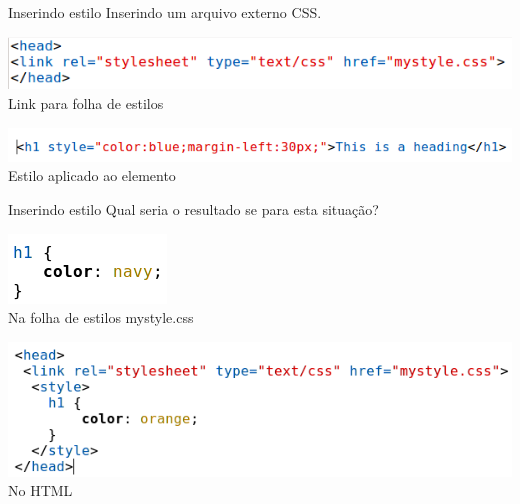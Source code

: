 \documentclass{beamer}
\begin{document}
\begin{frame}{Inserindo estilo}
Inserindo um arquivo externo CSS.
  \begin{center}
    \includegraphics[height=0.12\paperheight]{fig/aula3/external_css.png} \\
    \tiny Link para folha de estilos
  \end{center}
  \begin{center}
    \includegraphics[height=0.08\paperheight]{fig/aula3/estilo_elemento.png} \\
    \tiny Estilo aplicado ao elemento
  \end{center} 
\end{frame}
\begin{frame}{Inserindo estilo}
Qual seria o resultado se para esta situação?
  \begin{center}
    \includegraphics[height=0.2\paperheight]{fig/aula3/h1_css.png} \\
		  \tiny Na folha de estilos mystyle.css
	  \end{center}
	  \begin{center}
		  \includegraphics[height=0.3\paperheight]{fig/aula3/h1_html.png} \\
		  \tiny No HTML
	  \end{center}
	  
\end{frame}
\end{document}
